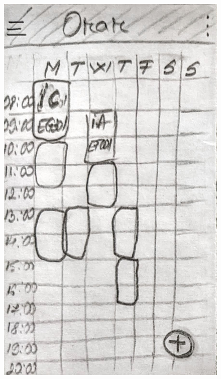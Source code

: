 \begin{figure}[ht]
         \includegraphics[height=0.279\textheight]{figures/app/paper/timetable.jpg}

\end{figure}
